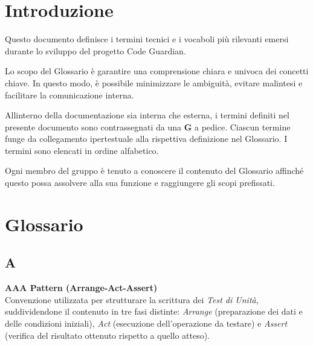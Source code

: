 \documentclass[12pt, a4paper]{article}
\begin{document}
\newpage


\tableofcontents

\newpage


\section*{Introduzione}
{}

Questo documento definisce i termini tecnici e i vocaboli più rilevanti
emersi durante lo sviluppo del progetto Code Guardian.

Lo scopo del Glossario è garantire una comprensione chiara e univoca dei
concetti chiave. In questo modo, è possibile minimizzare le ambiguità,
evitare malintesi e facilitare la comunicazione interna.

All\textquotesingle interno della documentazione sia interna che
esterna, i termini definiti nel presente documento sono contrassegnati
da una \textbf{G} a pedice. Ciascun termine funge da collegamento
ipertestuale alla rispettiva definizione nel Glossario. I termini sono
elencati in ordine alfabetico.

Ogni membro del gruppo è tenuto a conoscere il contenuto del Glossario
affinché questo possa assolvere alla sua funzione e raggiungere gli
scopi prefissati.

\newpage

\section*{Glossario}
{}

\subsection*{A}
{}
\vspace{0.2cm}

\noindent\hypertarget{aaa-pattern}{\textbf{AAA Pattern (Arrange-Act-Assert)}} \\[0.1em]
Convenzione utilizzata per strutturare la scrittura dei \textit{Test di Unità}, suddividendone il contenuto in tre fasi distinte: \textit{Arrange} (preparazione dei dati e delle condizioni iniziali), \textit{Act} (esecuzione dell'operazione da testare) e \textit{Assert} (verifica del risultato ottenuto rispetto a quello atteso).
\vspace{0.5cm}
\end{document}
